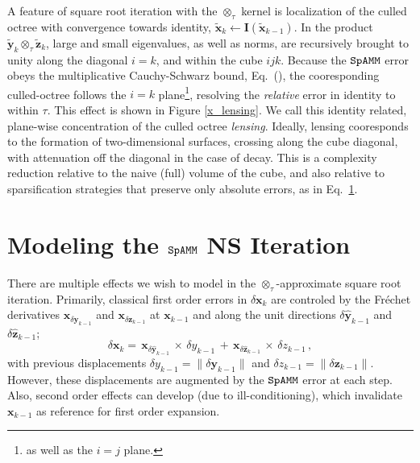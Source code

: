 \documentclass[letterpaper,twocolumn,amsmath,amsfont,amssymb,english,aps,jcp,preprintnumbers,groupaddress,nofootinbib,tightenlines]{revtex4}
\newcommand{\mat}[1]{\boldsymbol{#1}}
\newcommand{\ot}{ {\scriptstyle \otimes}_{ \tau } }
\begin{document}
A feature of square root iteration with the $\ot$ kernel is localization of the culled octree 
with convergence towards identity, $\widetilde{\mat{x}}_k \leftarrow \mat{I}\left( \widetilde{\mat{x}}_{k-1} \right)$.  In the product 
$\widetilde{\mat{y}}_k \ot \widetilde{\mat{z}}_k$, large and small eigenvalues, as well as norms, 
are recursively brought to unity along the diagonal $i=k$, and within the cube $ijk$.
Because the $\tt SpAMM$ error obeys the multiplicative Cauchy-Schwarz bound, Eq.~(),  the 
cooresponding culled-octree follows the $i=k$ plane\footnote{as well as the $i=j$ plane.}, resolving 
the {\em relative} error in identity to within $\tau$.   
This effect is shown in Figure \ref{x_lensing}.   We call this identity related,  plane-wise concentration of the culled octree 
{\em lensing}.  Ideally, lensing cooresponds to the formation of two-dimensional surfaces, crossing along the cube diagonal, with attenuation 
off the diagonal in the case of decay.  This is a complexity reduction relative to the naive (full) volume of the cube,
and also relative to sparsification strategies that preserve only absolute errors, as in Eq.~\ref{}.  

\section{Modeling the ${\tt SpAMM}$ NS Iteration}

There are multiple effects we wish to model in the $\ot$-approximate square root iteration.  Primarily, 
classical first order errors  in $\delta \mat{x}_k$ are controled by the 
Fr\'{e}chet derivatives \cite{} ${\mat{x}}_{\delta \mat{y}_{k-1}}$ and ${\mat{x}}_{\delta \mat{z}_{k-1}}$ 
at $\mat{x}_{k-1}$ and along the unit directions  $\delta \widehat{\mat{y}}_{k-1}$ and $\delta \widehat{\mat{z}}_{k-1}$;
\begin{equation}
\delta \mat{x}_k = \,  { \mat{x}}_{\delta \widehat{\mat{y}}_{k-1}}  \, {\scriptstyle \times} \, \delta y_{k-1} 
                 \, + \,  { \mat{x}}_{\delta \widehat{\mat{z}}_{k-1}}  \, {\scriptstyle \times} \, \delta z_{k-1}  \, ,
\end{equation}
with previous displacements $\delta y_{k-1} = \lVert \delta \mat{y}_{k-1} \rVert$  and  $\delta z_{k-1}=\lVert \delta \mat{z}_{k-1} \rVert$.
However, these displacements are augmented by the $\tt SpAMM$ error at each step.   
Also, second order effects can develop (due to ill-conditioning), which invalidate $\mat{x}_{k-1}$ as reference for 
first order expansion.   
 
\end{document}
